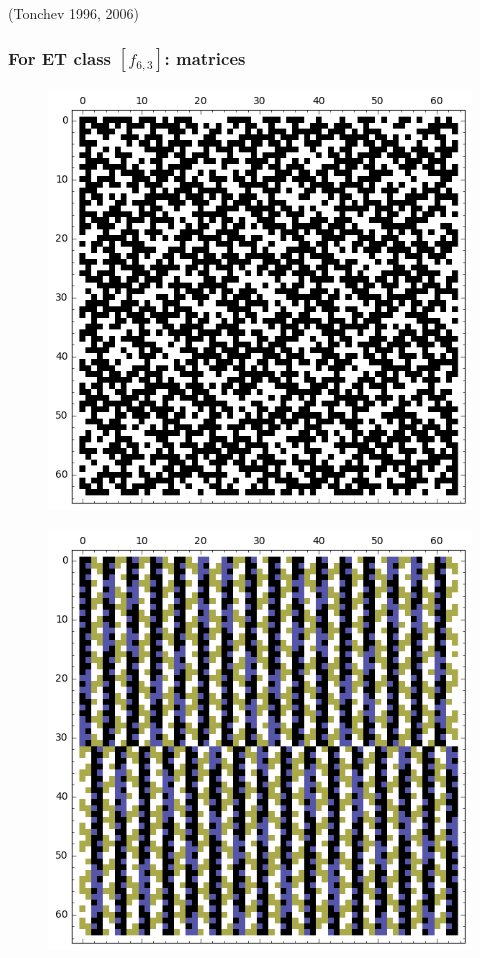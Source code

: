 \documentclass[pdf,sprung,slideColor,nocolorBG]{beamer}
\newenvironment{colortheme}[1]{
\def\ProvidesPackageRCS $##1${\relax}
\renewcommand{\ProcessOptions}{\relax}
\makeatletter

\makeatother
}{}
\newcommand{\slidecite}[1]{\tiny{(#1)}\normalsize{}}
\begin{document}
\begin{colortheme}{jubata}
\begin{frame}
\slidecite{Tonchev 1996, 2006}
\end{frame}
\begin{frame}
\frametitle{For ET class $[f_{6,3}]$: matrices}
\begin{figure}
\centering
\begin{minipage}{.48\textwidth}
  \centering
  \includegraphics[width=.9\linewidth]{../matrix_plot/c6_3_weight_class_matrix.png}
  \label{fig:6_3_weight_class_matrix}
\end{minipage}%
\begin{minipage}{.48\textwidth}
  \centering
  \includegraphics[width=.9\linewidth]{../matrix_plot/c6_3_bent_cayley_graph_index_matrix.png}

\end{minipage}
\end{figure}
\end{frame}
\end{colortheme}
\end{document}
